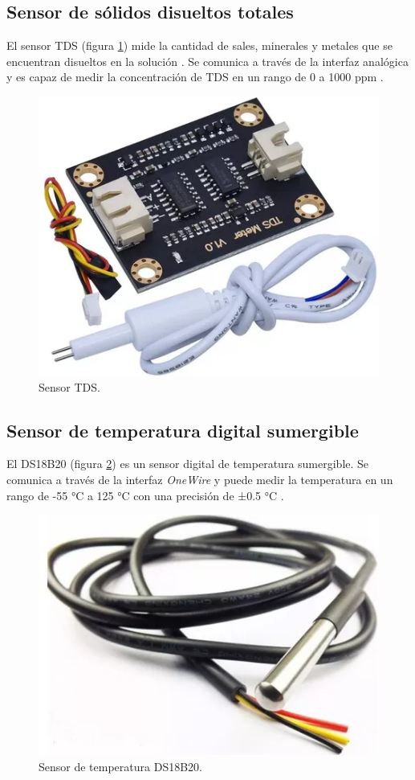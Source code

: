 
\subsection{Sensor de sólidos disueltos totales}

El sensor TDS (figura \ref{fig:TDS}) mide la cantidad de sales, minerales y
metales que se encuentran disueltos en la solución \cite{TDS-description}. Se
comunica a través de la interfaz analógica y es capaz de medir la concentración
de TDS en un rango de 0 a 1000 ppm \cite{TDS-Sensor}.

\begin{figure}[H]
	\centering
	\includegraphics[height=.15\textwidth]{./Images/9.png}
	\caption{Sensor TDS\protect\footnotemark.}
	\label{fig:TDS}
\end{figure}


\subsection{Sensor de temperatura digital sumergible}

El DS18B20 (figura \ref{fig:DS18B20}) es un sensor digital de temperatura
sumergible. Se comunica a través de la interfaz \textit{OneWire} y puede medir
la temperatura en un rango de -55 °C a 125 °C con una precisión de ±0.5 °C
\cite{DS18B20}.

\begin{figure}[H]
	\centering
	\includegraphics[height=.15\textwidth]{./Images/10.png}
	\caption{Sensor de temperatura DS18B20\protect\footnotemark.}
	\label{fig:DS18B20}
\end{figure}


